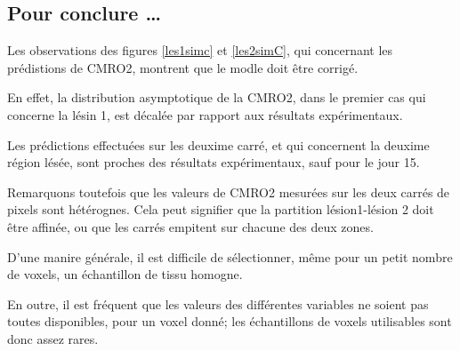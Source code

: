 \subsection{Pour conclure \dots}

Les observations des figures \ref{les1simc} et \ref{les2simC}, qui concernant les pr\'edistions de CMRO2, %
montrent que le modle doit \^etre corrig\'e.

\par
En effet, la distribution asymptotique de la CMRO2, dans le premier cas qui concerne la l\'esin 1, %
est d\'ecal\'ee par rapport aux r\'esultats exp\'erimentaux.

\par
Les pr\'edictions effectu\'ees sur les deuxime carr\'e, et qui concernent la deuxime r\'egion l\'es\'ee, %
sont proches des r\'esultats exp\'erimentaux, sauf pour le jour 15.

\etoile
Remarquons toutefois que les valeurs de CMRO2 mesur\'ees sur les deux carr\'es de pixels sont h\'et\'erognes. %
Cela peut signifier que la partition \og{} l\'esion1-l\'esion 2\fg{} doit \^etre affin\'ee, %
ou que les carr\'es empitent sur chacune des deux zones.

\par
D'une manire g\'en\'erale, il est difficile de s\'electionner, m\^eme pour un petit nombre de voxels, %
un \'echantillon de tissu homogne.

\par
En outre, il est fr\'equent que les valeurs des diff\'erentes variables ne soient pas toutes disponibles, pour un voxel donn\'e; %
les \'echantillons de voxels utilisables sont donc assez rares.

